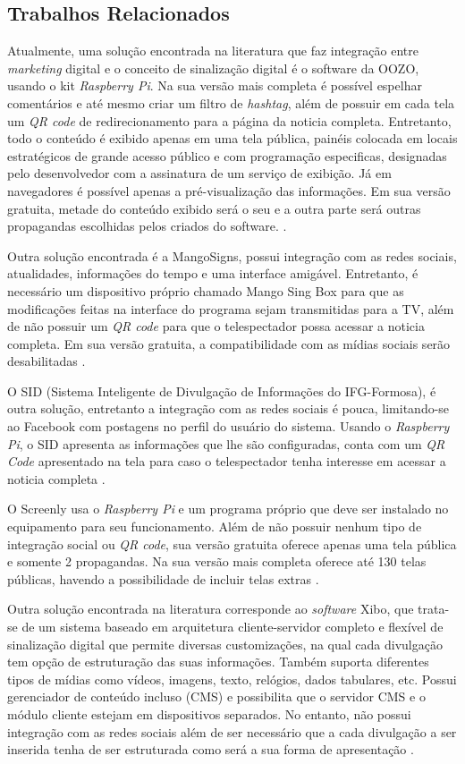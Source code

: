 \documentclass[
	12pt,				%
	openright,			%
	oneside,			%
	a4paper,			%
	english,			%
	french,				%
	spanish,			%
	brazil,				%
	]{abntex2}
\begin{document}
	\subsection*{Trabalhos Relacionados}
	Atualmente, uma solução encontrada na literatura que faz integração entre \textit{marketing} digital e o conceito de sinalização digital é o software da OOZO, usando o kit \textit{Raspberry Pi}. Na sua versão mais completa é possível espelhar comentários e até mesmo criar um filtro de \textit{hashtag}, além de possuir em cada tela um \textit{QR code} de redirecionamento para a página da noticia completa. Entretanto, todo o conteúdo é exibido apenas em uma tela pública, painéis colocada em locais estratégicos de grande acesso público e com programação especificas, designadas pelo desenvolvedor com a assinatura de um serviço de exibição. Já em navegadores é possível apenas a pré-visualização das informações. Em sua versão gratuita, metade do conteúdo exibido será o seu e a outra parte será outras propagandas escolhidas pelos criados do software. \cite{oozo2017}.
	
	Outra solução encontrada é a MangoSigns, possui integração com as redes sociais, atualidades, informações do tempo e uma interface amigável. Entretanto, é necessário um dispositivo próprio chamado Mango Sing Box para que as modificações feitas na interface do programa sejam transmitidas para a TV, além de não possuir um \textit{QR code} para que o telespectador possa acessar a noticia completa. Em sua versão gratuita, a compatibilidade com as mídias sociais serão desabilitadas \cite{mango2017}.
	
	O SID (Sistema Inteligente de Divulgação de Informações do IFG-Formosa), é outra solução, entretanto a integração com as redes sociais é pouca, limitando-se ao Facebook com postagens no perfil do usuário do sistema. Usando o \textit{Raspberry Pi}, o SID apresenta as informações que lhe são configuradas, conta com um \textit{QR Code} apresentado na tela para caso o telespectador tenha interesse em acessar a noticia completa \cite{sobrinho2017}.
	
	O Screenly usa o \textit{Raspberry Pi} e um programa próprio que deve ser instalado no equipamento para seu funcionamento. Além de não possuir nenhum tipo de integração social ou \textit{QR code}, sua versão gratuita oferece apenas uma tela pública e somente 2 propagandas. Na sua versão mais completa oferece até 130 telas públicas, havendo a possibilidade de incluir telas extras \cite{screenly2017}.
	
	Outra solução encontrada na literatura corresponde ao \textit{software} Xibo, que trata-se de um sistema baseado em arquitetura cliente-servidor completo e flexível de sinalização digital que permite diversas customizações, na qual cada divulgação tem opção de estruturação das suas informações. Também suporta diferentes tipos de mídias como vídeos, imagens, texto, relógios, dados tabulares, etc. Possui gerenciador de conteúdo incluso (CMS) e possibilita que o servidor CMS e o módulo cliente estejam em dispositivos separados. No entanto, não possui integração com as redes sociais além de ser necessário que a cada divulgação a ser inserida tenha de ser estruturada como será a sua forma de apresentação \cite{xibo2017}.
	
\end{document}
